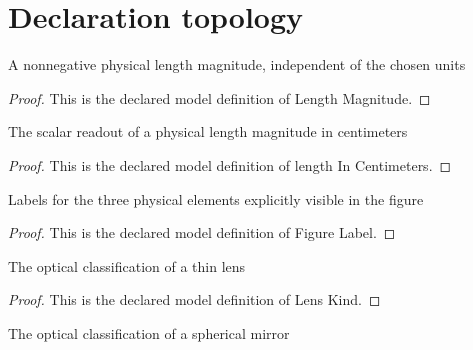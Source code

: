 \section{Declaration topology}
\begin{definition}
  \label{def:physics:phyx-mini-0077:phyxminiproblems-problemphyxmini0077-lengthmagnitude}
  A nonnegative physical length magnitude, independent of the chosen units
\end{definition}
\begin{proof}
  This is the declared model definition of Length Magnitude.
\end{proof}
\begin{definition}
  \label{def:physics:phyx-mini-0077:phyxminiproblems-problemphyxmini0077-lengthincentimeters}
  The scalar readout of a physical length magnitude in centimeters
\end{definition}
\begin{proof}
  This is the declared model definition of length In Centimeters.
\end{proof}
\begin{definition}
  \label{def:physics:phyx-mini-0077:phyxminiproblems-problemphyxmini0077-figurelabel}
  Labels for the three physical elements explicitly visible in the figure
\end{definition}
\begin{proof}
  This is the declared model definition of Figure Label.
\end{proof}
\begin{definition}
  \label{def:physics:phyx-mini-0077:phyxminiproblems-problemphyxmini0077-lenskind}
  The optical classification of a thin lens
\end{definition}
\begin{proof}
  This is the declared model definition of Lens Kind.
\end{proof}
\begin{definition}
  \label{def:physics:phyx-mini-0077:phyxminiproblems-problemphyxmini0077-mirrorkind}
  The optical classification of a spherical mirror
\end{definition}
